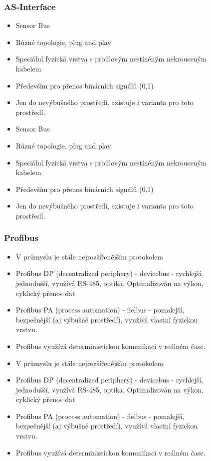 \begin{figure}[h]
\subsubsection*{AS-Interface}
\begin{itemize}
  \item Sensor Bus
  \item Různé topologie, plug and play 
  \item Speciální fyzická vrstva s profilovým nestíněným nekrouceným kabelem
  \item Především pro přenos binárních signálů (0,1)
  \item Jen do nevýbušného prostředí, existuje i varianta pro toto prostředí.
    \item Sensor Bus
    \item Různé topologie, plug and play
    \item Speciální fyzická vrstva s profilovým nestíněným nekrouceným kabelem
    \item Především pro přenos binárních signálů (0,1)
    \item Jen do nevýbušného prostředí, existuje i varianta pro toto prostředí.
\end{itemize}

\subsubsection*{Profibus}

\begin{itemize}
  \item V průmyslu je stále nejrozšířenějším protokolem
  \item Profibus DP (decentralized periphery) - devicebus - rychlejší, jednodušší, využívá RS-485, optika. Optimalizován na výkon, cyklický přenos dat
  \item Profibus PA (process automation) - fielbus - pomalejší, bezpečnější (aj výbušné prostředí), využívá vlastní fyzickou vrstvu.
  \item Profibus využívá deterministickou komunikaci v reálném čase.
    \item V průmyslu je stále nejrozšířenějším protokolem
    \item Profibus DP (decentralized periphery) - devicebus - rychlejší, jednodušší, využívá RS-485, optika. Optimalizován na výkon, cyklický přenos dat
    \item Profibus PA (process automation) - fielbus - pomalejší, bezpečnější (aj výbušné prostředí), využívá vlastní fyzickou vrstvu.
    \item Profibus využívá deterministickou komunikaci v reálném čase.
\end{itemize}


\end{figure}
